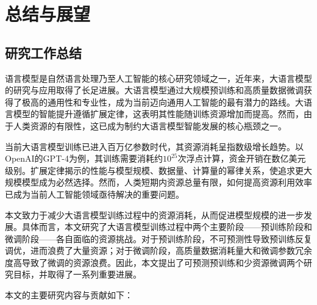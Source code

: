 \chapter{总结与展望}

\section{研究工作总结}

语言模型是自然语言处理乃至人工智能的核心研究领域之一，近年来，大语言模型的研究与应用取得了长足进展。大语言模型通过大规模预训练和高质量数据微调获得了极高的通用性和专业性，成为当前迈向通用人工智能的最有潜力的路线。大语言模型的智能提升遵循扩展定律，这表明其性能随训练资源增加而提高。然而，由于人类资源的有限性，这已成为制约大语言模型智能发展的核心瓶颈之一。

当前大语言模型训练已进入百万亿参数时代，其资源消耗呈指数级增长趋势。以OpenAI的GPT-4为例，其训练需要消耗约$10^{25}$次浮点计算，资金开销在数亿美元级别。扩展定律揭示的性能与模型规模、数据量、计算量的幂律关系，使追求更大规模模型成为必然选择。然而，人类短期内资源总量有限，如何提高资源利用效率已成为当前人工智能领域亟待解决的重要问题。

本文致力于减少大语言模型训练过程中的资源消耗，从而促进模型规模的进一步发展。具体而言，本文研究了大语言模型训练过程中两个主要阶段——预训练阶段和微调阶段——各自面临的资源挑战。对于预训练阶段，不可预测性导致预训练反复调优，进而浪费了大量资源；对于微调阶段，高质量数据消耗量大和微调参数冗余度高导致了微调的资源浪费。因此，本文提出了可预测预训练和少资源微调两个研究目标，并取得了一系列重要进展。

本文的主要研究内容与贡献如下：


